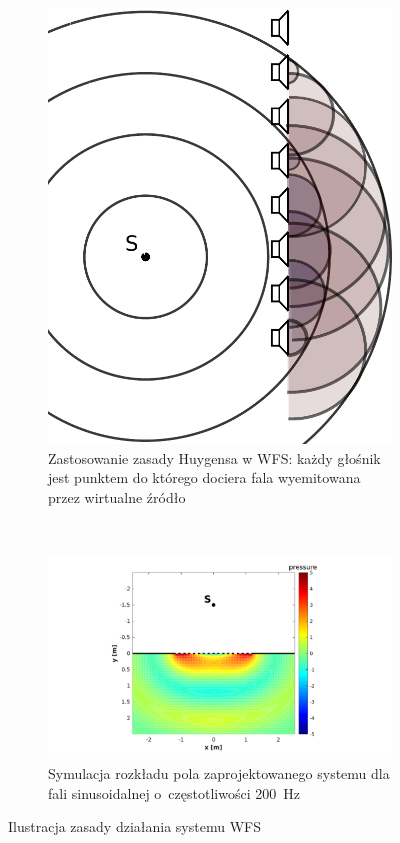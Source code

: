 \documentclass[10pt, a4paper]{article}
\begin{document}
\begin{figure}[!tbh]
  \centering
  \begin{subfigure}[b]{.49\textwidth}
  \centering
  \includegraphics[scale=.35]{vecgraphics/WFS_idea.pdf}
  \caption{Zastosowanie zasady Huygensa w WFS: każdy głośnik jest punktem do
  którego dociera fala wyemitowana przez wirtualne źródło}
  \label{r:Huygens}
  \end{subfigure}
  ~
  \begin{subfigure}[b]{.49\textwidth}
  \centering
  \includegraphics[width=\textwidth, trim={4.2cm 0.5cm 4.5cm .5cm}, clip]{vecgraphics/symulacja200Hz.pdf}
  \caption{Symulacja rozkładu pola zaprojektowanego systemu dla fali sinusoidalnej o~częstotliwości \SI{200}{\hertz}}
  \label{r:Huygens}
  \end{subfigure}
  \caption{Ilustracja zasady działania systemu WFS}
\end{figure}
\end{document}
